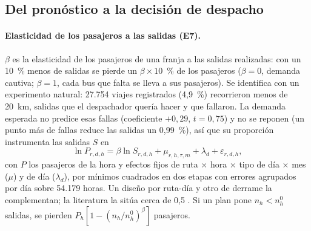 \subsection{Del pronóstico a la decisión de despacho}
\label{sec:decision}

\paragraph{Elasticidad de los pasajeros a las salidas (E7).}
$\beta$ es la elasticidad de los pasajeros de una franja a las salidas realizadas: con un 10~\% menos de salidas se
pierde un $\beta \times 10$~\% de los pasajeros ($\beta = 0$, demanda cautiva; $\beta = 1$, cada bus que falta se lleva
a sus pasajeros). Se identifica con un experimento natural: 27.754 viajes registrados (4,9~\%) recorrieron menos de
20~km, salidas que el despachador quería hacer y que fallaron. La demanda esperada no predice esas fallas
(coeficiente $+0{,}29$, $t = 0{,}75$) y no se reponen (un punto más de fallas reduce las salidas un 0,99~\%), así que su
proporción instrumenta las salidas $S$ en
\begin{equation}
  \ln P_{r,d,h} = \beta \ln S_{r,d,h} + \mu_{r,h,\tau,m} + \lambda_d + \varepsilon_{r,d,h},
  \label{eq:beta}
\end{equation}
con $P$ los pasajeros de la hora y efectos fijos de ruta $\times$ hora $\times$ tipo de día $\times$ mes ($\mu$) y de día
($\lambda_d$), por mínimos cuadrados en dos etapas \citep{wooldridge2010panel} con errores agrupados por día sobre
54.179 horas. Un diseño por ruta-día y otro de derrame la complementan; la literatura la sitúa cerca de 0,5
\citep{evans2004tcrp95}. Si un plan pone $n_h < n^0_h$ salidas, se pierden $P_h [1 - (n_h/n^0_h)^{\beta}]$ pasajeros.

